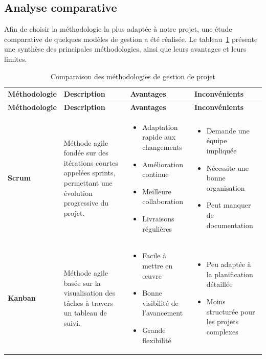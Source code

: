\subsection{Analyse comparative}

Afin de choisir la méthodologie la plus adaptée à notre projet, une étude comparative de quelques modèles de gestion a été réalisée. Le tableau~\ref{tab:comparaison_methodes} présente une synthèse des principales méthodologies, ainsi que leurs avantages et leurs limites.

\footnotesize
\renewcommand{\arraystretch}{1.15}

\begin{longtable}{|p{2.3cm}|p{4.2cm}|p{4cm}|p{4cm}|}
\caption{Comparaison des méthodologies de gestion de projet}
\label{tab:comparaison_methodes} \\

\hline
\textbf{Méthodologie} & \textbf{Description} & \textbf{Avantages} & \textbf{Inconvénients} \\ \hline
\endfirsthead

\hline
\textbf{Méthodologie} & \textbf{Description} & \textbf{Avantages} & \textbf{Inconvénients} \\ \hline
\endhead

\hline
\endfoot

\textbf{Scrum} &
Méthode agile fondée sur des itérations courtes appelées sprints, permettant une évolution progressive du projet. &
\begin{itemize}[leftmargin=*,nosep]
    \item Adaptation rapide aux changements
    \item Amélioration continue
    \item Meilleure collaboration
    \item Livraisons régulières
\end{itemize}
&
\begin{itemize}[leftmargin=*,nosep]
    \item Demande une équipe impliquée
    \item Nécessite une bonne organisation
    \item Peut manquer de documentation
\end{itemize} \\ \hline

\textbf{Kanban} &
Méthode agile basée sur la visualisation des tâches à travers un tableau de suivi. &
\begin{itemize}[leftmargin=*,nosep]
    \item Facile à mettre en œuvre
    \item Bonne visibilité de l'avancement
    \item Grande flexibilité
\end{itemize}
&
\begin{itemize}[leftmargin=*,nosep]
    \item Peu adaptée à la planification détaillée
    \item Moins structurée pour les projets complexes
\end{itemize} \\ \hline


\end{longtable}
